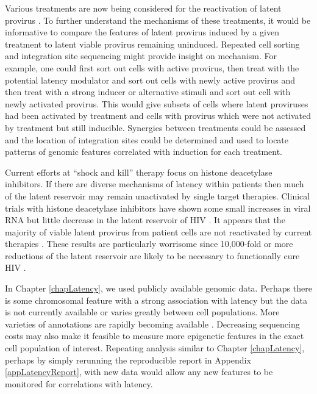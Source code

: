 \documentclass[../sherrill-Mix_thesis.tex]{subfiles}
\begin{document}
	Various treatments are now being considered for the reactivation of latent provirus \citep{Spina2013}. To further understand the mechanisms of these treatments, it would be informative to compare the features of latent provirus induced by a given treatment to latent viable provirus remaining uninduced. Repeated cell sorting and integration site sequencing might provide insight on mechanism. For example, one could first sort out cells with active provirus, then treat with the potential latency modulator and sort out cells with newly active provirus and then treat with a strong inducer or alternative stimuli and sort out cell with newly activated provirus. This would give subsets of cells where latent proviruses had been activated by treatment and cells with provirus which were not activated by treatment but still inducible. Synergies between treatments could be assessed and the location of integration sites could be determined and used to locate patterns of genomic features correlated with induction for each treatment.

	Current efforts at ``shock and kill'' therapy focus on histone deacetylase inhibitors. If there are diverse mechanisms of latency within patients then much of the latent reservoir may remain unactivated by single target therapies.  Clinical trials with histone deacetylase inhibitors have shown some small increases in viral RNA but little decrease in the latent reservoir of HIV \citep{Lehrman2005,Archin2010,Archin2012,Spivak2014}. It appears that the majority of viable latent provirus from patient cells are not reactivated by current therapies \citep{Cillo2014}. These results are particularly worrisome since 10,000-fold or more reductions of the latent reservoir are likely to be necessary to functionally cure HIV \citep{Hill2014}.

	In Chapter \ref{chapLatency}, we used publicly available genomic data. Perhaps there is some chromosomal feature with a strong association with latency but the data is not currently available or varies greatly between cell populations. More varieties of annotations are rapidly becoming available \citep{ENCODEPC2012,Barrett2013,Karolchik2014,Goldman2015,Cunningham2015}. Decreasing sequencing costs \citep{Metzker2010,Mardis2011,Wetterstrand2015} may also make it feasible to measure more epigenetic features in the exact cell population of interest. Repeating analysis similar to Chapter \ref{chapLatency}, perhaps by simply rerunning the reproducible report in Appendix \ref{appLatencyReport}, with new data would allow any new features to be monitored for correlations with latency.
\end{document}
